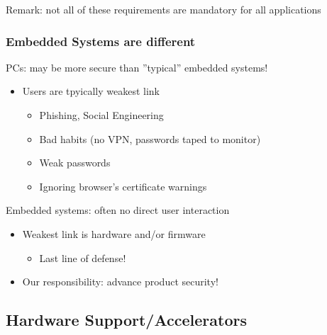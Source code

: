 Remark: not all of these requirements are mandatory for all applications

\subsubsection{Embedded Systems are different}
PCs: may be more secure than ''typical'' embedded systems!
\begin{itemize}
  \item Users are tpyically weakest link
  \begin{itemize}
    \item Phishing, Social Engineering
    \item Bad habits (no VPN, passwords taped to monitor)
    \item Weak passwords
    \item Ignoring browser's certificate warnings
  \end{itemize}
\end{itemize}
Embedded systems: often no direct user interaction
\begin{itemize}
  \item Weakest link is hardware and/or firmware
  \begin{itemize}
    \item Last line of defense!
  \end{itemize}
  \item Our responsibility: advance product security!
\end{itemize}

\subsection{Hardware Support/Accelerators}

